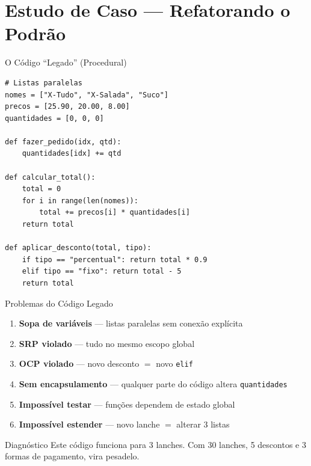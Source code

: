 \documentclass[aspectratio=169]{beamer}
\begin{document}
\section{Estudo de Caso --- Refatorando o Podrão}

\begin{frame}[fragile]{O Código ``Legado'' (Procedural)}
\begin{lstlisting}
# Listas paralelas
nomes = ["X-Tudo", "X-Salada", "Suco"]
precos = [25.90, 20.00, 8.00]
quantidades = [0, 0, 0]

def fazer_pedido(idx, qtd):
    quantidades[idx] += qtd

def calcular_total():
    total = 0
    for i in range(len(nomes)):
        total += precos[i] * quantidades[i]
    return total

def aplicar_desconto(total, tipo):
    if tipo == "percentual": return total * 0.9
    elif tipo == "fixo": return total - 5
    return total
\end{lstlisting}
\end{frame}

\begin{frame}{Problemas do Código Legado}
\begin{enumerate}
  \item \textbf{Sopa de variáveis} --- listas paralelas sem conexão explícita
  \item \textbf{SRP violado} --- tudo no mesmo escopo global
  \item \textbf{OCP violado} --- novo desconto $=$ novo \texttt{elif}
  \item \textbf{Sem encapsulamento} --- qualquer parte do código altera \texttt{quantidades}
  \item \textbf{Impossível testar} --- funções dependem de estado global
  \item \textbf{Impossível estender} --- novo lanche $=$ alterar 3 listas
\end{enumerate}

\begin{alertblock}{Diagnóstico}
Este código funciona para 3 lanches. Com 30 lanches, 5 descontos e 3 formas de pagamento, vira pesadelo.
\end{alertblock}
\end{frame}
\end{document}
